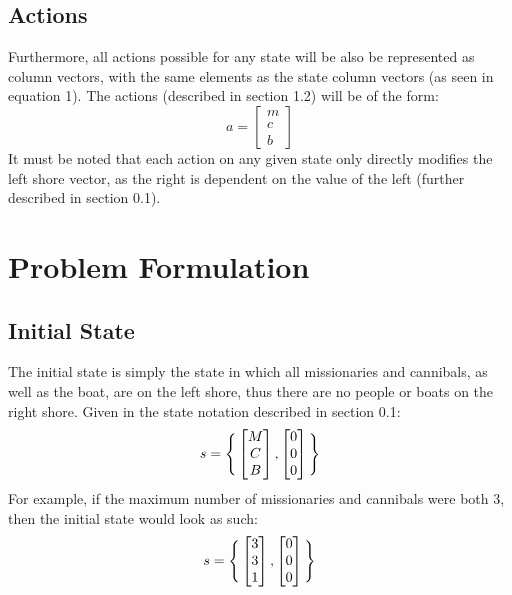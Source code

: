 \documentclass[11pt]{article}
\begin{document}
\subsection{Actions}
Furthermore, all actions possible for any state will be also be represented as column vectors, with the same elements as the state column vectors (as seen in equation 1). The actions (described in section 1.2) will be of the form:
 \begin{equation}
a=
\begin{bmatrix}
m\\
c\\
b
\end{bmatrix}
\end{equation}
It must be noted that each action on any given state only directly modifies the left shore vector, as the right is dependent on the value of the left (further described in section 0.1).

\section{Problem Formulation}
\subsection{Initial State}
The initial state is simply the state in which all missionaries and cannibals, as well as the boat, are on the left shore, thus there are no people or boats on the right shore. Given in the state notation described in section 0.1:
\begin{equation}
s= 
\Bigg{\{}
\begin{bmatrix}
M\\
C\\
B
\end{bmatrix},
\begin{bmatrix}
0\\
0\\
0
\end{bmatrix}
\Bigg{\}}
\end{equation}
For example, if the maximum number of missionaries and cannibals were both 3, then the initial state would look as such:
\begin{equation}
s= 
\Bigg{\{}
\begin{bmatrix}
3\\
3\\
1
\end{bmatrix},
\begin{bmatrix}
0\\
0\\
0
\end{bmatrix}
\Bigg{\}}
\end{equation}
\end{document}
